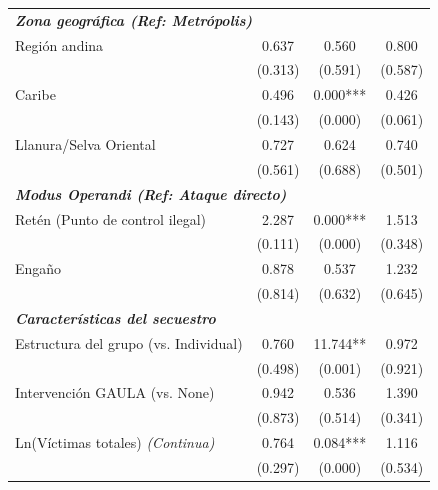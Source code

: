 \documentclass[12pt]{article}
\theoremstyle{definition}
\theoremstyle{remark}
\newcommand{\1}{\mathbf{1}}
\begin{document}
{\begin{ThreePartTable}
\begin{longtable}{lccc}
        \multicolumn{4}{l}{\textbf{\textit{Zona geográfica (Ref: Metrópolis)}}} \\
        Región andina & 0.637 & 0.560 & 0.800 \\
                      & {\scriptsize (0.313)} & {\scriptsize (0.591)} & {\scriptsize (0.587)} \\
        Caribe & 0.496 & 0.000*** & 0.426 \\
                  & {\scriptsize (0.143)} & {\scriptsize (0.000)} & {\scriptsize (0.061)} \\
        Llanura/Selva Oriental & 0.727 & 0.624 & 0.740 \\
                              & {\scriptsize (0.561)} & {\scriptsize (0.688)} & {\scriptsize (0.501)} \\
        \midrule
        
        \multicolumn{4}{l}{\textbf{\textit{Modus Operandi (Ref: Ataque directo)}}} \\
        Retén (Punto de control ilegal) & 2.287 & 0.000*** & 1.513 \\
                                       & {\scriptsize (0.111)} & {\scriptsize (0.000)} & {\scriptsize (0.348)} \\
        Engaño & 0.878 & 0.537 & 1.232 \\
                  & {\scriptsize (0.814)} & {\scriptsize (0.632)} & {\scriptsize (0.645)} \\
        \midrule
        
        \multicolumn{4}{l}{\textbf{\textit{Características del secuestro}}} \\
        Estructura del grupo (vs. Individual) & 0.760 & 11.744** & 0.972 \\
                                         & {\scriptsize (0.498)} & {\scriptsize (0.001)} & {\scriptsize (0.921)} \\
        Intervención GAULA (vs. None) & 0.942 & 0.536 & 1.390 \\
                           & {\scriptsize (0.873)} & {\scriptsize (0.514)} & {\scriptsize (0.341)} \\
        Ln(Víctimas totales) \textit{(Continua)} & 0.764 & 0.084*** & 1.116 \\
                          & {\scriptsize (0.297)} & {\scriptsize (0.000)} & {\scriptsize (0.534)} \\
        \midrule
        

\end{longtable}
\end{ThreePartTable}}
\end{document}
